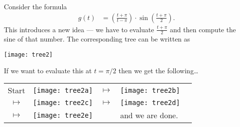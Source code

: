 \begin{eg}\label{eg_0_5_1}
Consider the formula
  \begin{align*}
  g(t) &= \left(\frac{t+\pi}{t-\pi} \right) \cdot \sin\left( \frac{t+\pi}{2}
\right).
\end{align*}
  This introduces a new idea --- we have to evaluate $\frac{t+\pi}{2}$ and then
compute the sine of that number. The corresponding tree can be written as
\begin{efig}
\begin{center}
\texttt{[image: tree2]}
\end{center}
\end{efig}
  If we want to evaluate this at $t = \pi/2$ then we get the following\dots
\begin{wfig}
\begin{center}
\begin{tabular}{c m{58mm} c m{58mm} c}
  Start
  & \texttt{[image: tree2a]}
  & $\mapsto$
  & \texttt{[image: tree2b]}
  &
  \\[15ex]
  $\mapsto$
  & \texttt{[image: tree2c]}
  & $\mapsto$
  & \texttt{[image: tree2d]}
  & \\[15ex]
  $\mapsto$
  & \texttt{[image: tree2e]}
  & & and we are done.
\end{tabular}
\end{center}
\end{wfig}

\end{eg}


